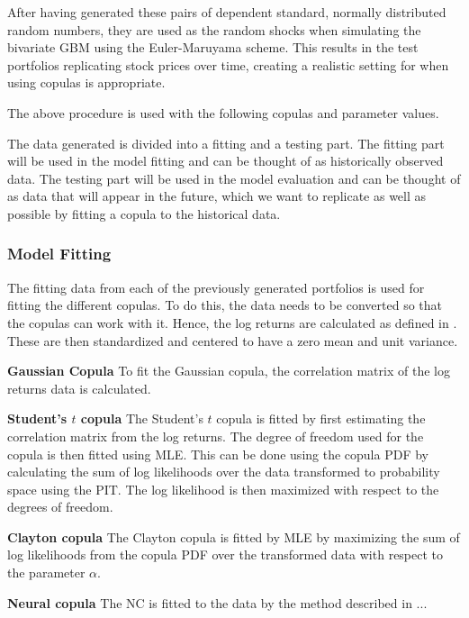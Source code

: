 After having generated these pairs of dependent standard, normally distributed random numbers, they are used as the random shocks when simulating the bivariate \gls{GBM} using the Euler-Maruyama scheme. This results in the test portfolios replicating stock prices over time, creating a realistic setting for when using copulas is appropriate. 

The above procedure is used with the following copulas and parameter values. 

The data generated is divided into a fitting and a testing part. The fitting part will be used in the model fitting and can be thought of as historically observed data. The testing part will be used in the model evaluation and can be thought of as data that will appear in the future, which we want to replicate as well as possible by fitting a copula to the historical data. 

\subsubsection{Model Fitting}
The fitting data from each of the previously generated portfolios is used for fitting the different copulas. To do this, the data needs to be converted so that the copulas can work with it. Hence, the log returns are calculated as defined in . These are then standardized and centered to have a zero mean and unit variance. 

\textbf{Gaussian Copula}
To fit the Gaussian copula, the correlation matrix of the log returns data is calculated.  

\textbf{Student's $t$ copula} 
The Student's $t$ copula is fitted by first estimating the correlation matrix from the log returns. The degree of freedom used for the copula is then fitted using \gls{MLE}. This can be done using the copula \gls{PDF} by calculating the sum of log likelihoods over the data transformed to probability space using the \gls{PIT}. The log likelihood is then maximized with respect to the degrees of freedom. 

\textbf{Clayton copula}
The Clayton copula is fitted by \gls{MLE} by maximizing the sum of log likelihoods from the copula \gls{PDF} over the transformed data with respect to the parameter $\alpha$. 

\textbf{Neural copula}
The \gls{NC} is fitted to the data by the method described in ... 


